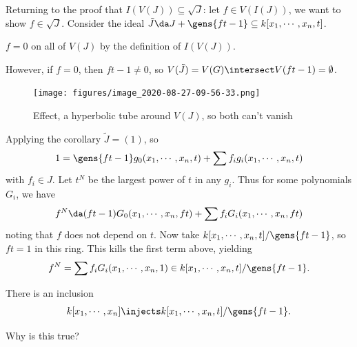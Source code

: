 Returning to the proof that \(I(V(J)) \subseteq \sqrt{J}\): let
\(f\in V(I(J))\), we want to show \(f\in \sqrt{J}\). Consider the ideal
\(\tilde J \da J + \gens{ft - 1} \subseteq k[x_1, \cdots, x_n, t]\).

\begin{observation}

\(f = 0\) on all of \(V(J)\) by the definition of \(I(V(J))\).

\end{observation}

However, if \(f=0\), then \(ft-1 \neq 0\), so
\(V(\tilde J) = V(G) \intersect V(ft-1) = \emptyset\).

\begin{figure}
\centering
\texttt{[image: figures/image\_2020-08-27-09-56-33.png]}
\caption{Effect, a hyperbolic tube around \(V(J)\), so both can't
vanish}
\end{figure}

Applying the corollary \(\tilde J = (1)\), so
\begin{align*}
1 = \gens{ft-1} g_0(x_1, \cdots, x_n, t) + \sum f_i g_i(x_1, \cdots, x_n, t)
\end{align*} with \(f_i \in J\). Let \(t^N\) be the largest power of
\(t\) in any \(g_i\). Thus for some polynomials \(G_i\), we have
\begin{align*}  
f^N \da (ft-1) G_0(x_1, \cdots, x_n, ft) + \sum f_i G_i(x_1, \cdots, x_n, ft)
\end{align*} noting that \(f\) does not depend on \(t\). Now take
\(k[x_1, \cdots, x_n, t]/\gens{ft-1}\), so \(ft=1\) in this ring. This
kills the first term above, yielding
\begin{align*}  
f^N = \sum f_i G_i(x_1, \cdots, x_n, 1) \in k[x_1, \cdots, x_n, t]/\gens{ft-1}
.\end{align*}

\begin{observation}

There is an inclusion
\begin{align*}  
k[x_1, \cdots, x_n] \injects
k[x_1, \cdots, x_n, t]/\gens{ft-1}
.\end{align*}

\end{observation}

\begin{exercise}

Why is this true?

\end{exercise}

